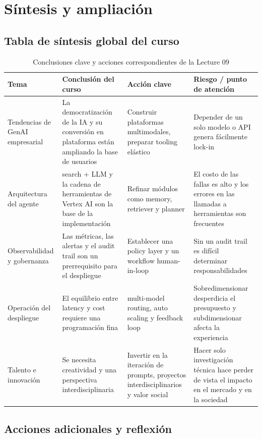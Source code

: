 \section{Síntesis y ampliación}

\subsection{Tabla de síntesis global del curso}

\begin{table}[H]
\centering
\begin{tabular}{p{} p{} p{} p{}}
\toprule
Tema & Conclusión del curso & Acción clave & Riesgo / punto de atención \\
\midrule
Tendencias de GenAI empresarial & La democratización de la IA y su conversión en plataforma están ampliando la base de usuarios & Construir plataformas multimodales, preparar tooling elástico & Depender de un solo modelo o API genera fácilmente lock-in \\
Arquitectura del agente & search + LLM y la cadena de herramientas de Vertex AI son la base de la implementación & Refinar módulos como memory, retriever y planner & El costo de las fallas es alto y los errores en las llamadas a herramientas son frecuentes \\
Observabilidad y gobernanza & Las métricas, las alertas y el audit trail son un prerrequisito para el despliegue & Establecer una policy layer y un workflow human-in-loop & Sin un audit trail es difícil determinar responsabilidades \\
Operación del despliegue & El equilibrio entre latency y cost requiere una programación fina & multi-model routing, auto scaling y feedback loop & Sobredimensionar desperdicia el presupuesto y subdimensionar afecta la experiencia \\
Talento e innovación & Se necesita creatividad y una perspectiva interdisciplinaria & Invertir en la iteración de prompts, proyectos interdisciplinarios y valor social & Hacer solo investigación técnica hace perder de vista el impacto en el mercado y en la sociedad \\
\bottomrule
\end{tabular}
\caption{Conclusiones clave y acciones correspondientes de la Lecture 09}
\end{table}

\subsection{Acciones adicionales y reflexión}

